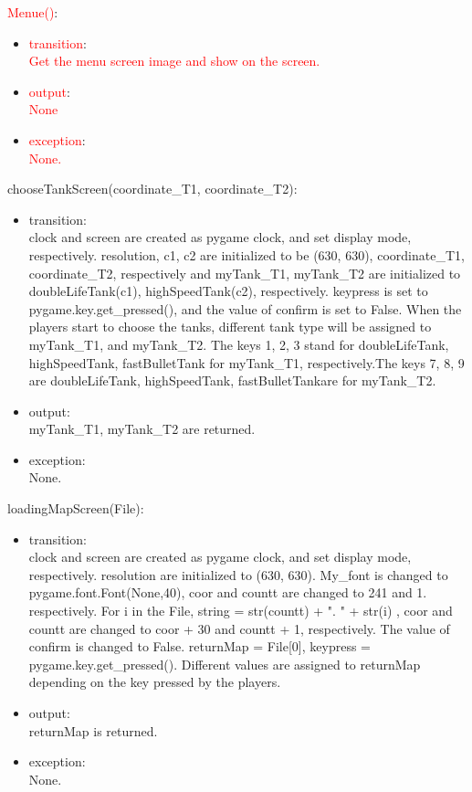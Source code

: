 \documentclass[12pt, titlepage]{article}
\begin{document}
		\textcolor{red}{Menue()}:
		\begin{itemize}
		\item \textcolor{red}{transition}:\\ \textcolor{red}{Get the menu screen image and show on the screen.}
		\item \textcolor{red}{output}:\\\textcolor{red}{None}
		\item \textcolor{red}{exception}:\\\textcolor{red}{None.}
		\end{itemize}
		
		chooseTankScreen(coordinate\_T1, coordinate\_T2):
		\begin{itemize}
		\item transition:\\ clock and screen are created as pygame clock, and set display mode, respectively. resolution, c1, c2 are initialized to be (630, 630), coordinate\_T1, coordinate\_T2, respectively and myTank\_T1, myTank\_T2 are initialized to doubleLifeTank(c1), highSpeedTank(c2), respectively. keypress is set to pygame.key.get\_pressed(), and the value of confirm is set to False. When the players start to choose the tanks, different tank type will be assigned to myTank\_T1, and myTank\_T2. The keys 1, 2, 3 stand for doubleLifeTank, highSpeedTank, fastBulletTank for myTank\_T1, respectively.The keys 7, 8, 9 are doubleLifeTank, highSpeedTank, fastBulletTankare for myTank\_T2.
		\item output:\\myTank\_T1, myTank\_T2 are returned.
		\item exception:\\None.
		\end{itemize}
		loadingMapScreen(File):
		\begin{itemize}
    		\item transition:\\clock and screen are created as pygame clock, and set display mode, respectively. resolution are initialized to (630, 630). My\_font is changed to pygame.font.Font(None,40), coor and countt are changed to 241 and 1. respectively. For i in the File, string = str(countt) + ". " + str(i) , coor and countt are changed to coor + 30 and countt + 1, respectively. The value of confirm is changed to False. returnMap = File[0], keypress = pygame.key.get\_pressed(). Different values are assigned to returnMap depending on the key pressed by the players.
		\item output:\\returnMap is returned.
		\item exception:\\None.
		\end{itemize}
		
\end{document}
